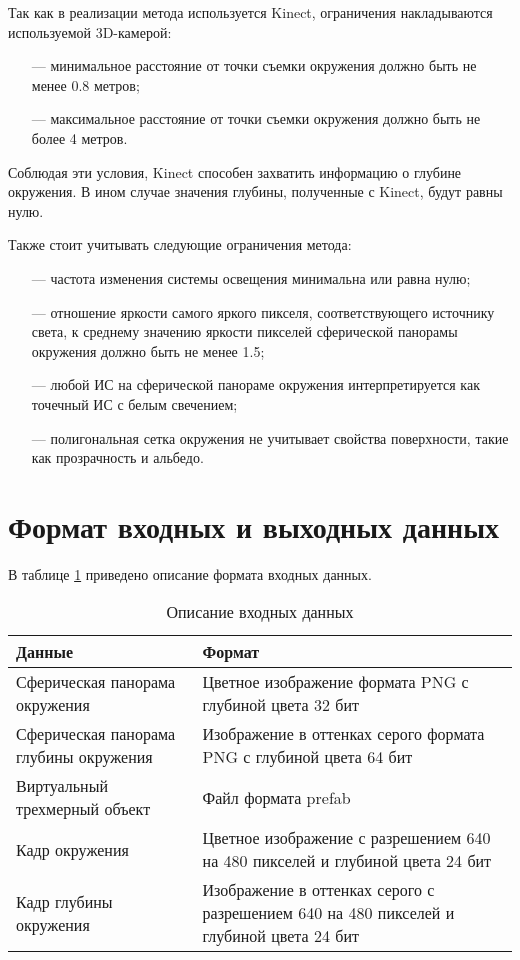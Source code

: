 Так как в реализации метода используется Kinect, ограничения накладываются используемой 3D-камерой:

\begin{itemize}
	\item[---] минимальное расстояние от точки съемки окружения должно быть не менее 0.8 метров;
	\item[---] максимальное расстояние от точки съемки окружения должно быть не более 4 метров.
\end{itemize}

Соблюдая эти условия, Kinect способен захватить информацию о глубине окружения. В ином случае значения глубины, полученные с Kinect, будут равны нулю.

Также стоит учитывать следующие ограничения метода:

\begin{itemize}
	\item[---] частота изменения системы освещения минимальна или равна нулю;
	\item[---] отношение яркости самого яркого пикселя, соответствующего источнику света, к среднему значению яркости пикселей сферической панорамы окружения должно быть не менее 1.5;
	\item[---] любой ИС на сферической панораме окружения интерпретируется как точечный ИС с белым свечением;
	\item[---] полигональная сетка окружения не учитывает свойства поверхности, такие как прозрачность и альбедо.
\end{itemize}

\section{Формат входных и выходных данных}

В таблице \ref{FormatData} приведено описание формата входных данных.

\begin{table}[H]
	\caption{Описание входных данных}
	\label{FormatData}
	\begin{center}
		\begin{tabular}{| p{6 cm} | p{9 cm} |} 
			\hline
			Данные & Формат \\
			\hline
			Сферическая панорама окружения & Цветное изображение формата PNG с глубиной цвета 32 бит \\
			\hline
			Сферическая панорама глубины окружения & Изображение в оттенках серого формата PNG с глубиной цвета 64 бит \\
			\hline
			Виртуальный трехмерный объект & Файл формата prefab \\
			\hline
			Кадр окружения & Цветное изображение с разрешением 640 на 480 пикселей и глубиной цвета 24 бит \\
			\hline
			Кадр глубины окружения & Изображение в оттенках серого с разрешением 640 на 480 пикселей и глубиной цвета 24 бит \\
			\hline
		\end{tabular}
	\end{center}
\end{table}

